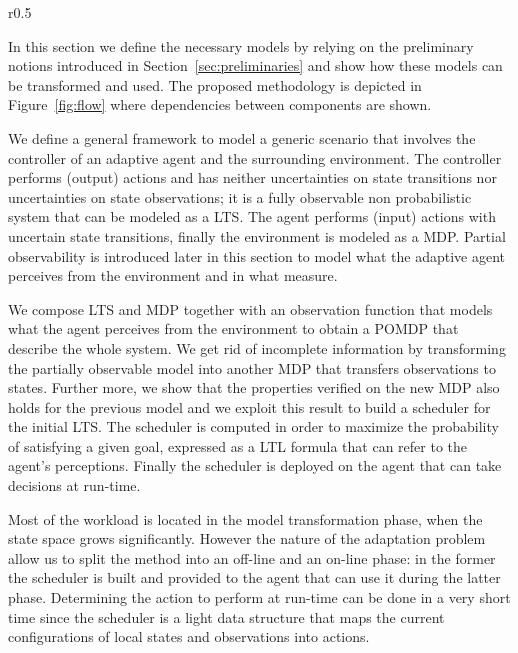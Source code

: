 \begin{wrapfigure}[19]{r}{0.5\textwidth}
	\caption{Elements and dependences of the proposed methodology}
	\label{fig:flow}
\end{wrapfigure}

In this section we define the necessary models by relying on the preliminary notions introduced in Section~\ref{sec:preliminaries} and show how these models can be transformed and used. The proposed methodology is depicted in Figure~\ref{fig:flow} where dependencies between components are shown.

We define a general framework to model a generic scenario that involves the controller of an adaptive agent and the surrounding environment.
The controller performs (output) actions and has neither uncertainties on state transitions nor uncertainties on state observations; it is a fully observable non probabilistic system that can be modeled as a \ac{LTS}. The agent performs (input) actions with uncertain state transitions, finally the environment is modeled as a \ac{MDP}. Partial observability is introduced later in this section to model what the adaptive agent perceives from the environment and in what measure.

We compose \ac{LTS} and \ac{MDP} together with an observation function that models what the agent perceives from the environment to obtain a \ac{POMDP} that describe the whole system. We get rid of incomplete information by transforming the partially observable model into another \ac{MDP} that transfers observations to states. Further more, we show that the properties verified on the new \ac{MDP} also holds for the previous model and we exploit this result to build a scheduler for the initial \ac{LTS}. The scheduler is computed in order to maximize the probability of satisfying a given goal, expressed as a \ac{LTL} formula that can refer to the agent's perceptions. Finally the scheduler is deployed on the agent that can take decisions at run-time.

Most of the workload is located in the model transformation phase, when the state space grows significantly. However the nature of the adaptation problem allow us to split the method into an off-line and an on-line phase: in the former the scheduler is built and provided to the agent that can use it during the latter phase. %
Determining the action to perform at run-time can be done in a very short time since the scheduler is a light data structure that maps the current configurations of local states and observations into actions.

